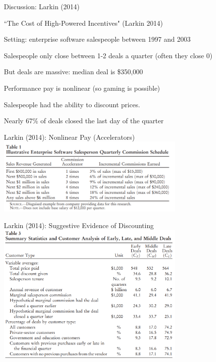 \documentclass[aspectratio=169,usenames,dvipsnames]{beamer}
\newenvironment{wideitemize}{\itemize\addtolength{\itemsep}{10pt}}{\enditemize}
\begin{document}
\begin{frame}
\centering
    \huge Discussion: Larkin (2014)
\end{frame}


\begin{frame}{``The Cost of High-Powered Incentives" (Larkin 2014)}

\begin{wideitemize}
    \item Setting: enterprise software salespeople between 1997 and 2003
    \item Salespeople only close between 1-2 deals a quarter (often they close 0)
    \item But deals are massive: median deal is \$350,000
    \item Performance pay is nonlinear (so gaming is possible)
    \item Salespeople had the ability to discount prices.
    \item Nearly 67\% of deals closed the last day of the quarter
\end{wideitemize}
\end{frame}

\begin{frame}[c]{Larkin (2014): Nonlinear Pay (Accelerators)}
\centering
\includegraphics[width=0.7\textwidth]{pictures/larkin_accelerator.png}

\end{frame}


\begin{frame}[c]{Larkin (2014): Suggestive Evidence of Discounting}
\centering
\includegraphics[width=0.7\textwidth]{pictures/larkin_suggestive.png}

\end{frame}
\end{document}
